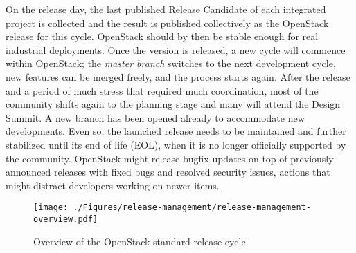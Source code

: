 On the release day, the last published Release Candidate of each integrated project is collected and the result is published collectively as the OpenStack release for this cycle. OpenStack should by then be stable enough for real industrial deployments. Once the version is released, a new cycle will commence within OpenStack; the \emph{master branch} switches to the next development cycle, new features can be merged freely, and the process starts again. After the release and a period of much stress that required much coordination, most of the community shifts again to the planning stage and many will attend the Design Summit. A new branch has been opened already to accommodate new developments. Even so, the launched release needs to be maintained and further stabilized until its end of life (EOL), when it is no longer officially supported by the community. OpenStack might release bugfix updates on top of previously announced releases with fixed bugs and resolved security issues, actions that might distract developers working on newer items. 



% 
% 


\begin{figure}[!ht]
  \centering
  \texttt{[image: ./Figures/release-management/release-management-overview.pdf]}
  \caption{Overview of the OpenStack standard release cycle.}
 \label{fig:3stageprocesspic}
\end{figure}



